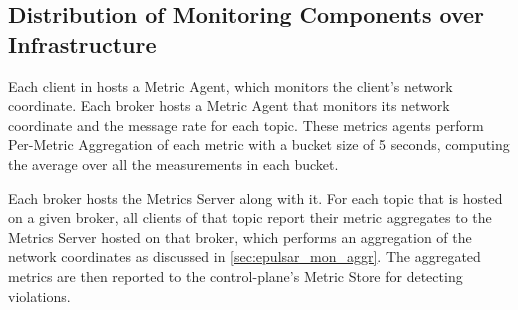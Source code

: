 \subsection{Distribution of Monitoring Components over Infrastructure}
Each client in \epulsar{} hosts a Metric Agent, which monitors the client's network coordinate. Each broker hosts a Metric Agent that monitors its network coordinate and the message rate for each topic. These metrics agents perform Per-Metric Aggregation of each metric with a bucket size of 5 seconds, computing the average over all the measurements in each bucket. 
\par Each broker hosts the Metrics Server along with it. For each topic that is hosted on a given broker, all clients of that topic report their metric aggregates to the Metrics Server hosted on that broker, which performs an aggregation of the network coordinates as discussed in \cref{sec:epulsar_mon_aggr}. The aggregated metrics are then reported to the control-plane's Metric Store for detecting violations.


